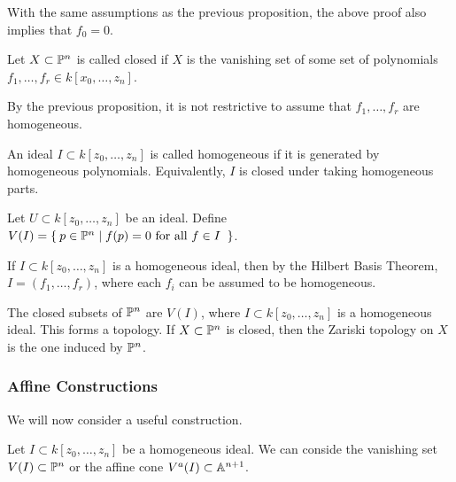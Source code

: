 \documentclass[twoside, 10pt]{article}
\begin{document}
    \begin{rmk}
        With the same assumptions as the previous proposition, the above proof also implies that $f_0 = 0$.
    \end{rmk}

    \begin{defn}
        Let $X \subset \P^n$ is called closed if $X$ is the vanishing set of some set of polynomials $f_1, \ldots, f_r \in k[x_0, \ldots, z_n]$.
    \end{defn}

    By the previous proposition, it is not restrictive to assume that $f_1, \ldots, f_r$ are homogeneous.

    \begin{defn}
        An ideal $I \subset k[z_0, \ldots, z_n]$ is called homogeneous if it is generated by homogeneous polynomials. Equivalently, $I$ is closed under taking homogeneous parts.
    \end{defn}

    \begin{defn}
        Let $U \subset k[z_0, \ldots, z_n]$ be an ideal. Define $V(I) = \Set{p \in \P^n | f(p) = 0 \text{ for all $f \in I$ }}$.
    \end{defn}

    \begin{rmk}
        If $I \subset k[z_0, \ldots, z_n]$ is a homogeneous ideal, then by the Hilbert Basis Theorem, $I = (f_1, \ldots, f_r)$, where each $f_i$ can be assumed to be homogeneous.
    \end{rmk}

    \begin{defn}
        The closed subsets of $\P^n$ are $V(I)$, where $I \subset k[z_0, \ldots, z_n]$ is a homogeneous ideal. This forms a topology. If $X \subset \P^n$ is closed, then the Zariski topology on $X$ is the one induced by $\P^n$.
    \end{defn}

    \subsubsection{Affine Constructions}

    We will now consider a useful construction. 
    \begin{defn}
        Let $I \subset k[z_0, \ldots, z_n]$ be a homogeneous ideal. We can conside the vanishing set $V(I) \subset \P^n$ or the affine cone $V^a(I) \subset \A^{n+1}$.
    \end{defn}
\end{document}
